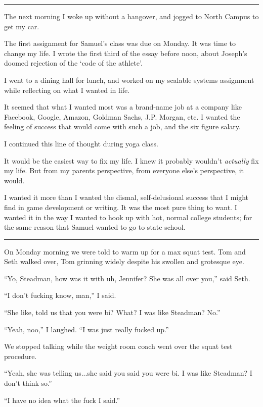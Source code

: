 \plainfancybreak{12pt}{2}{}

The next morning I woke up without a hangover, and jogged to North Campus to get
my car.  

The first assignment for Samuel's class was due on Monday.  It was time to
change my life.  I wrote the first third of the essay before noon, about
Joseph's doomed rejection of the `code of the athlete'.

I went to a dining hall for lunch, and worked on my scalable systems assignment
while reflecting on what I wanted in life.

It seemed that what I wanted most was a brand-name job at a company like
Facebook, Google, Amazon, Goldman Sachs, J.P.  Morgan, etc.  I wanted the
feeling of success that would come with such a job, and the six figure salary.

I continued this line of thought during yoga class.

It would be the easiest way to fix my life.  I knew it probably wouldn't
\textit{actually} fix my life.  But from my parents perspective, from everyone
else's perspective, it would.  

I wanted it more than I wanted the dismal, self-delusional success that I might
find in game development or writing.  It was the most pure thing to want. I
wanted it in the way I wanted to hook up with hot, normal college students; for
the same reason that Samuel wanted to go to state school. 

\plainfancybreak{12pt}{2}{}


On Monday morning we were told to warm up for a max squat test.  Tom and Seth
walked over, Tom grinning widely despite his swollen and grotesque eye.  

``Yo, Steadman, how was it with uh, Jennifer?  She was all over you,'' said
Seth.

``I don't fucking know, man,'' I said.

``She like, told us that you were bi?  What?  I was like Steadman?  No.''

``Yeah, noo,'' I laughed. ``I was just really fucked up.''

We stopped talking while the weight room coach went over the squat test
procedure.

``Yeah, she was telling us...she said you said you were bi.  I was like
Steadman?  I don't think so.''

``I have no idea what the fuck I said.''

